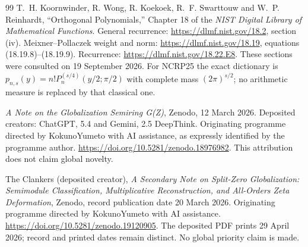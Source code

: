 \documentclass[11pt,a4paper]{article}
\begin{document}
\begin{thebibliography}{99}
T.~H. Koornwinder, R. Wong, R. Koekoek, R.~F. Swarttouw and
W.~P. Reinhardt, ``Orthogonal Polynomials,'' Chapter 18 of the
\emph{NIST Digital Library of Mathematical Functions}.
General recurrence: \url{https://dlmf.nist.gov/18.2}, section (iv).
Meixner--Pollaczek weight and norm:
\url{https://dlmf.nist.gov/18.19}, equations (18.19.8)--(18.19.9).
Recurrence: \url{https://dlmf.nist.gov/18.22.E8}.
These sections were consulted on 19 September 2026.
For NCRP25 the exact dictionary is
$p_{n,s}(y)=n!P_n^{(s/4)}(y/2;\pi/2)$ with complete mass
$(2\pi)^{s/2}$; no arithmetic measure is replaced by that classical one.

\emph{A Note on the Globalization Semiring G(Z)}, Zenodo,
12 March 2026. Deposited creators: ChatGPT, 5.4 and Gemini, 2.5 DeepThink.
Originating programme directed by KokunoYumeto with AI assistance,
as expressly identified by the programme author.
\url{https://doi.org/10.5281/zenodo.18976982}.
This attribution does not claim global novelty.

The Clankers (deposited creator), \emph{A Secondary Note on Split-Zero
Globalization: Semimodule Classification, Multiplicative Reconstruction,
and All-Orders Zeta Deformation}, Zenodo, record publication date
20 March 2026. Originating programme directed by KokunoYumeto
with AI assistance. \url{https://doi.org/10.5281/zenodo.19120905}.
The deposited PDF prints 29 April 2026; record and printed dates
remain distinct. No global priority claim is made.
\end{thebibliography}
\end{document}
